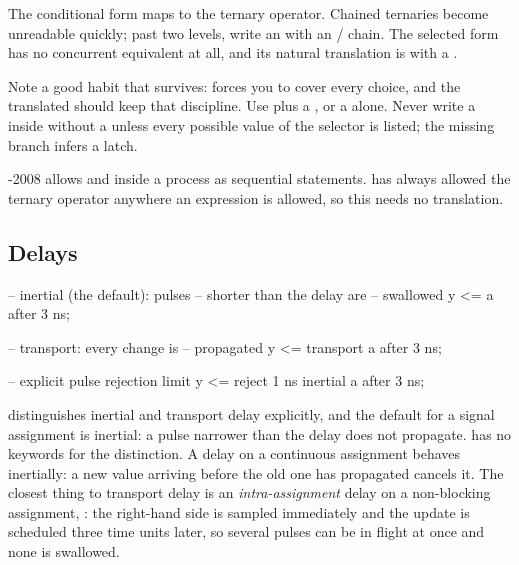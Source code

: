 The conditional form maps to the ternary operator. Chained ternaries become
unreadable quickly; past two levels, write an  with an
/ chain. The selected form has no concurrent equivalent
at all, and its natural translation is  with a .

Note a good \VHDL{} habit that survives:  forces you to cover
every choice, and the translated  should keep that discipline. Use
 plus a , or a  alone. Never
write a  inside  without a  unless
every possible value of the selector is listed; the missing branch infers a
latch.

\VHDL{}-2008 allows  and  inside a process
as sequential statements. \SV{} has always allowed the ternary operator
anywhere an expression is allowed, so this needs no translation.

\subsection{Delays}

\begin{rosetta}
\begin{rleft}
-- inertial (the default): pulses
-- shorter than the delay are
-- swallowed
y <= a after 3 ns;

-- transport: every change is
-- propagated
y <= transport a after 3 ns;

-- explicit pulse rejection limit
y <= reject 1 ns inertial a
       after 3 ns;
\end{rleft}
\end{rosetta}


\VHDL{} distinguishes inertial and transport delay explicitly, and the default
for a signal assignment is inertial: a pulse narrower than the delay does not
propagate. \SV{} has no keywords for the distinction. A delay on a continuous
assignment behaves inertially: a new value arriving before the old one has
propagated cancels it. The closest thing to transport delay is an
\emph{intra-assignment} delay on a non-blocking assignment, :
the right-hand side is sampled immediately and the update is scheduled three
time units later, so several pulses can be in flight at once and none is
swallowed.

